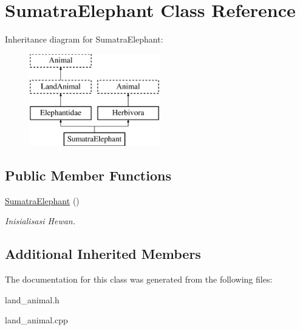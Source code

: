 \hypertarget{class_sumatra_elephant}{}\section{Sumatra\+Elephant Class Reference}
\label{class_sumatra_elephant}
Inheritance diagram for Sumatra\+Elephant\+:\begin{figure}[H]
\begin{center}
\leavevmode
\includegraphics[height=4.000000cm]{class_sumatra_elephant}
\end{center}
\end{figure}
\subsection*{Public Member Functions}
\begin{DoxyCompactItemize}
\item 
\hyperlink{class_sumatra_elephant_a60483d7dca334a03bbbfcd3a1a8367e3}{Sumatra\+Elephant} ()\hypertarget{class_sumatra_elephant_a60483d7dca334a03bbbfcd3a1a8367e3}{}\label{class_sumatra_elephant_a60483d7dca334a03bbbfcd3a1a8367e3}

\begin{DoxyCompactList}\small\item\em Inisialisasi Hewan. \end{DoxyCompactList}\end{DoxyCompactItemize}
\subsection*{Additional Inherited Members}


The documentation for this class was generated from the following files\+:\begin{DoxyCompactItemize}
\item 
land\+\_\+animal.\+h\item 
land\+\_\+animal.\+cpp\end{DoxyCompactItemize}
